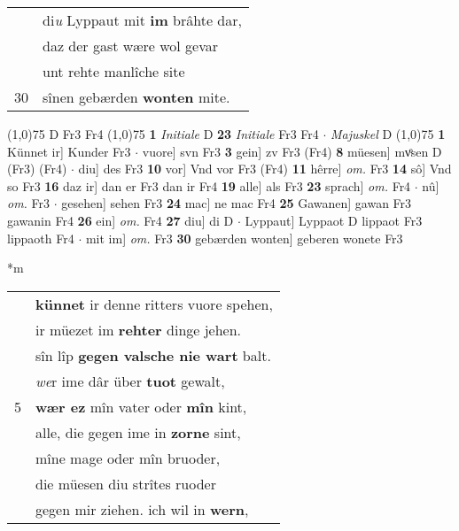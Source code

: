 \documentclass[8pt,a4paper,notitlepage]{article}
\begin{document}
\begin{table}[ht]
\begin{minipage}[t]{0.5\linewidth}
\begin{tabular}{rl}
 & di\textit{u} Lyppaut mit \textbf{im} brâhte dar,\\ 
 & daz der gast wære wol gevar\\ 
 & unt rehte manlîche site\\ 
30 & sînen gebærden \textbf{wonten} mite.\\ 
\end{tabular}
\scriptsize
\line(1,0){75} \newline
D Fr3 Fr4 \newline
\line(1,0){75} \newline
\textbf{1} \textit{Initiale} D  \textbf{23} \textit{Initiale} Fr3 Fr4   $\cdot$ \textit{Majuskel} D  \newline
\line(1,0){75} \newline
\textbf{1} Künnet ir] Kunder Fr3  $\cdot$ vuore] svn Fr3 \textbf{3} gein] zv Fr3 (Fr4) \textbf{8} müesen] mvͦsen D (Fr3) (Fr4)  $\cdot$ diu] des Fr3 \textbf{10} vor] Vnd vor Fr3 (Fr4) \textbf{11} hêrre] \textit{om.} Fr3 \textbf{14} sô] Vnd so Fr3 \textbf{16} daz ir] dan er Fr3 dan ir Fr4 \textbf{19} alle] als Fr3 \textbf{23} sprach] \textit{om.} Fr4  $\cdot$ nû] \textit{om.} Fr3  $\cdot$ gesehen] sehen Fr3 \textbf{24} mac] ne mac Fr4 \textbf{25} Gawanen] gawan Fr3 gawanin Fr4 \textbf{26} ein] \textit{om.} Fr4 \textbf{27} diu] di D  $\cdot$ Lyppaut] Lyppaot D lippaot Fr3 lippaoth Fr4  $\cdot$ mit im] \textit{om.} Fr3 \textbf{30} gebærden wonten] geberen wonete Fr3 \newline
\end{minipage}
\hspace{0.5cm}
\begin{minipage}[t]{0.5\linewidth}
\small
\begin{center}*m
\end{center}
\begin{tabular}{rl}
 & \textbf{künnet} ir denne ritters vuore spehen,\\ 
 & ir müezet im \textbf{rehter} dinge jehen.\\ 
 & sîn lîp \textbf{gegen valsche nie wart} balt.\\ 
 & \textit{we}r ime dâr über \textbf{tuot} gewalt,\\ 
5 & \textbf{wær ez} mîn vater oder \textbf{mîn} kint,\\ 
 & alle, die gegen ime in \textbf{zorne} sint,\\ 
 & mîne mage oder mîn bruoder,\\ 
 & die müesen diu strîtes ruoder\\ 
 & gegen mir ziehen. ich wil in \textbf{wern},\\ 

\end{tabular}
\end{minipage}
\end{table}
\end{document}
